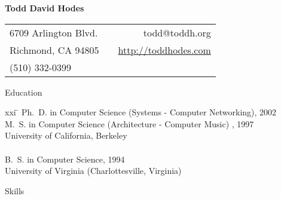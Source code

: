 \setlength{\oddsidemargin}{0.25 in}
\setlength{\evensidemargin}{-0.25 in}
\setlength{\topmargin}{-0.95 in}
\setlength{\textwidth}{6.5 in}
\setlength{\textheight}{10 in}
\setlength{\headsep}{0.35 in}
\setlength{\parindent}{0 in}
\setlength{\parskip}{0.01 in}


\addtolength{\evensidemargin}{-15pt}
\addtolength{\oddsidemargin}{-15pt}

\pagestyle{empty}


\begin{center} \bf
\Large
                               Todd David Hodes
\medskip
\normalsize


\begin{tabular}{lp{3.2in}r}
6709 Arlington Blvd.  & & todd@toddh.org \\
Richmond, CA  94805 & & \url{http://toddhodes.com} \\
(510)  332-0399 \\
\end{tabular}

\end{center}

\bigskip


\begin{bf} \large
Education \\[-18pt]
\end{bf}

\begin{tabbing}
xxi \= \kill
\>   Ph.\ D. in Computer Science (Systems - Computer Networking), 2002  \\
\>   M.\ S. in Computer Science (Architecture - Computer Music) , 1997 \\
\>   University of California, Berkeley  \\
\smallskip \\[-6pt]
\>   B.\ S. in Computer Science, 1994 \\
\>   University of Virginia (Charlottesville, Virginia)\\
\end{tabbing}


\begin{bf} \large
Skills  \\[-16pt]
\end{bf}

